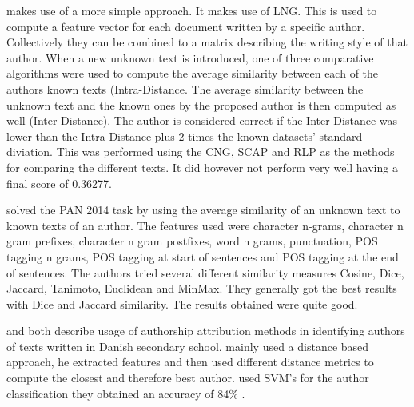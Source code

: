 \cite{layton:2014} makes use of a more simple approach. It makes use of
\gls{LNG}. This is used to compute a feature vector for each document written
by a specific author. Collectively they can be combined to a matrix describing
the writing style of that author. When a new unknown text is introduced, one of
three comparative algorithms were used to compute the average similarity between
each of the authors known texts (Intra-Distance. The average similarity between
the unknown text and the known ones by the proposed author is then computed as
well (Inter-Distance). The author is considered correct if the Inter-Distance
was lower than the Intra-Distance plus 2 times the known datasets' standard
diviation. This was performed using the \gls{CNG}, \gls{SCAP} and \gls{RLP} as
the methods for comparing the different texts. It did however not perform very
well having a final score of 0.36277.

\cite{castro2015} solved the PAN 2014 task by using the average similarity of
an unknown text to known texts of an author. The features used were character
n-grams, character n gram prefixes, character n gram postfixes, word n grams,
punctuation, \gls{POS} tagging n grams, \gls{POS} tagging at start of sentences
and \gls{POS} tagging at the end of sentences. The authors tried several
different similarity measures Cosine, Dice, Jaccard, Tanimoto, Euclidean and
MinMax. They generally got the best results with Dice and Jaccard similarity.
The results obtained were quite good.

\cite{hansen2014} and \cite{aalykke2016} both describe usage of authorship
attribution methods in identifying authors of texts written in Danish secondary
school. \cite{aalykke2016} mainly used a distance based approach, he extracted
features and then used different distance metrics to compute the closest and
therefore best author. \cite{hansen2014} used SVM's for the author
classification they obtained an accuracy of 84\% .
